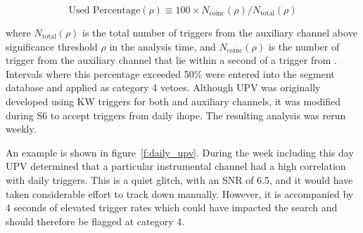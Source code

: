 \begin{equation*}
\textrm{Used Percentage}(\rho) \equiv 100 \times
N_\textrm{coinc}(\rho) / N_\textrm{total}(\rho)
\end{equation*}

where $N_\textrm{total}(\rho)$ is the total number of triggers from
the auxiliary channel above significance threshold $\rho$ in the
analysis time, and $N_\textrm{coinc}(\rho)$ is the number of trigger
from the auxiliary channel that lie within a second of a trigger from
\darmerr.  Intervals where this percentage exceeded 50\% were entered
into the segment database and applied as category 4 vetoes.  Although
UPV was originally developed using KW triggers for both \darmerr and
auxiliary channels, it was modified during S6 to accept triggers from
daily ihope.  The resulting analysis was rerun weekly.



An example is shown in figure~\ref{f:daily_upv}.  During the week
including this day UPV determined that a particular instrumental
channel had a high correlation with daily triggers.  This is a 
quiet glitch, with an SNR of 6.5, and it would have taken
considerable effort to track down manually.  However, it is
accompanied by 4 seconds of elevated trigger rates which could have
impacted the search and should therefore be flagged at category 4.

